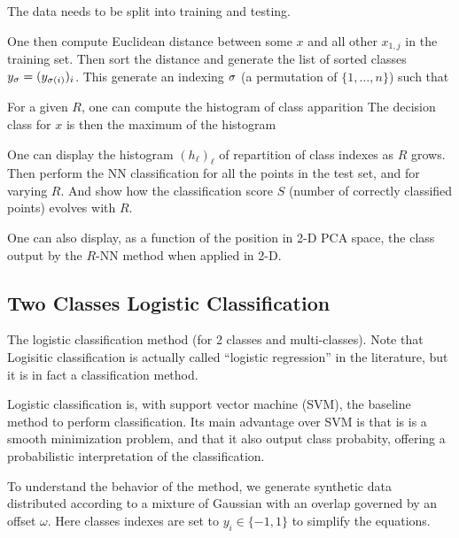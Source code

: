 The data needs to be split into training and testing.

One then compute Euclidean distance between some $x$ 
and all other $x_{1,j}$ in the training set. 
%
Then sort the distance and generate the list of sorted classes $ y_\sigma = (y_{\sigma(i)})_i$. This
generate an indexing $\sigma$ (a permutation of $\{1,\ldots,n\}$) such that 


For a given $R$, one can compute the histogram of class apparition
The decision class for $x$ is then the maximum of the histogram

One can display the histogram $(h_\ell)_\ell$ of repartition of class indexes as $R$ grows.
% 
Then perform the NN classification for all the points in the test set, and for varying $R$.
And show how the classification score $S$ (number of correctly classified points)
evolves with $R$.



One can also display, as a function of the position in 2-D PCA space, the class output by 
the $R$-NN method when applied in 2-D.






\subsection{Two Classes Logistic Classification}



The logistic classification method (for 2 classes and
multi-classes). Note that Logisitic classification is actually called ``logistic
regression'' in the literature, but it is in fact a classification method.

Logistic classification is, with support vector machine (SVM), the baseline
method to perform classification. Its main advantage over SVM is that is
is a smooth minimization problem, and that it also output class
probabity, offering a probabilistic interpretation of the classification.

To understand the behavior of the method, we generate synthetic data
distributed according to a mixture of Gaussian with an overlap governed by an offset $\omega$.
 Here classes indexes are set to $y_i \in
\{-1,1\}$ to simplify the equations.


